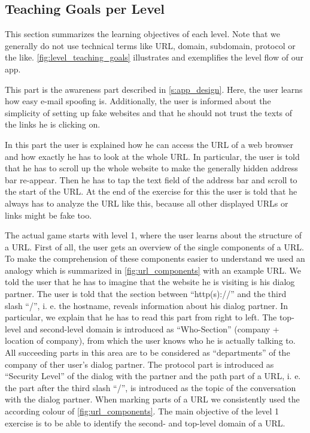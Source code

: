 \subsection{Teaching Goals per Level}
\label{s:knowledgetransferperlevel}
This section summarizes the learning objectives of each level.
 Note that we generally do not use technical terms like URL, domain, subdomain, protocol or the like. \autoref{fig:level_teaching_goals} illustrates and exemplifies the level flow of our app.


\begin{description}[leftmargin=0cm]
	\item[Introduction 1] This part is the awareness part described in \autoref{s:app_design}. Here, the user learns how easy e-mail spoofing is.
 Additionally, the user is informed about the simplicity of setting up fake websites and that he should not trust the texts of the links he is clicking on.

	\item[Introduction 2] In this part the user is explained how he can access the URL of a web browser and how exactly he has to look at the whole URL.
 In particular, the user is told that he has to scroll up the whole website to make the generally hidden address bar re-appear.
 Then he has to tap the text field of the address bar and scroll to the start of the URL.
 At the end of the exercise for this the user is told that he always has to analyze the URL like this, because all other displayed URLs or links might be fake too.

	\item[Level 1] The actual game starts with level 1, where the user learns about the structure of a URL.
 First of all, the user gets an overview of the single components of a URL.
 To make the comprehension of these components easier to understand we used an analogy which is summarized in \autoref{fig:url_components} with an example URL.
 We told the user that he has to imagine that the website he is visiting is his dialog partner.
 The user is told that the section between ``http(s)://'' and the third slash ``/'', i.
e.
 the hostname, reveals information about his dialog partner.
 In particular, we explain that he has to read this part from right to left.
 The top-level and second-level domain is introduced as ``Who-Section'' (company + location of company), from which the user knows who he is actually talking to.
 All succeeding parts in this area are to be considered as ``departments'' of the company of ther user's dialog partner.
 The protocol part is introduced as ``Security Level'' of the dialog with the partner and the path part of a URL, i.
e.
 the part after the third slash ``/'', is introduced as the topic of the conversation with the dialog partner.
 When marking parts of a URL we consistently used the according colour of \autoref{fig:url_components}. The main objective of the level 1 exercise is to be able to identify the second- and top-level domain of a URL.


\end{description}

